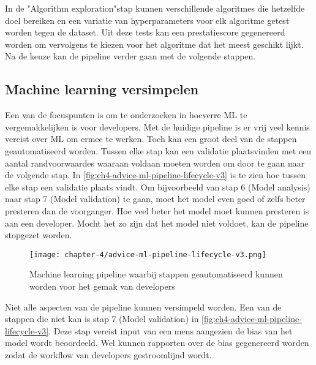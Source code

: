 In de "Algorithm exploration"\space stap kunnen verschillende algoritmes die hetzelfde doel bereiken en een variatie van hyperparameters voor elk algoritme getest worden tegen de dataset. Uit deze tests kan een prestatiescore gegenereerd worden om vervolgens te kiezen voor het algoritme dat het meest geschikt lijkt. Na de keuze kan de pipeline verder gaan met de volgende stappen.

\subsection{Machine learning versimpelen}\label{subsec:ch4-machine-learning-versimpelen}
Een van de focuspunten is om te onderzoeken in hoeverre ML te vergemakkelijken is voor developers. Met de huidige pipeline is er vrij veel kennis vereist over ML om ermee te werken. Toch kan een groot deel van de stappen geautomatiseerd worden. Tussen elke stap kan een validatie plaatsvinden met een aantal randvoorwaardes waaraan voldaan moeten worden om door te gaan naar de volgende stap. In \autoref{fig:ch4-advice-ml-pipeline-lifecycle-v3} is te zien hoe tussen elke stap een validatie plaats vindt. Om bijvoorbeeld van stap 6 (Model analysis) naar stap 7 (Model validation) te gaan, moet het model even goed of zelfs beter presteren dan de voorganger. Hoe veel beter het model moet kunnen presteren is aan een developer. Mocht het zo zijn dat het model niet voldoet, kan de pipeline stopgezet worden.

\newpage

\begin{figure}[hbt!]
  \centering
  \texttt{[image: chapter-4/advice-ml-pipeline-lifecycle-v3.png]}
  \caption{Machine learning pipeline waarbij stappen geautomatiseerd kunnen worden voor het gemak van developers}
  \label{fig:ch4-advice-ml-pipeline-lifecycle-v3}
\end{figure}

Niet alle aspecten van de pipeline kunnen versimpeld worden. Een van de stappen die niet kan is stap 7 (Model validation) in \autoref{fig:ch4-advice-ml-pipeline-lifecycle-v3}. Deze stap vereist input van een mens aangezien de bias van het model wordt beoordeeld. Wel kunnen rapporten over de bias gegenereerd worden zodat de workflow van developers gestroomlijnd wordt.